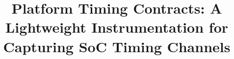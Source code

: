 \documentclass[conference]{IEEEtran}
\begin{document}
\newcommand{\para}[1]{\vspace{0.6\baselineskip}\noindent\textbf{#1.}}

\newcommand{\Pic}{Platform timing contract\xspace}
\newcommand{\pic}{platform timing contract\xspace}
\newcommand{\Pics}{Platform timing contracts\xspace}
\newcommand{\pics}{platform timing contracts\xspace}
\newcommand{\pici}{platform timing contract instrumentation\xspace}
\newcommand{\Pici}{Platform timing contract instrumentation\xspace}
\newcommand{\PICI}{PTCI\xspace}
\newcommand{\PICIs}{PTCIs\xspace}
\newcommand{\ucfi}{$\mu$CFI\xspace}

\title{Platform Timing Contracts: A Lightweight Instrumentation for Capturing SoC Timing Channels}

\end{document}
